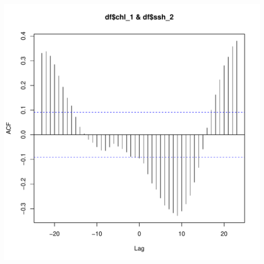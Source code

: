 \documentclass{article}\usepackage[]{graphicx}\usepackage[]{color}
\makeatletter
\def\maxwidth{ %
  \ifdim\Gin@nat@width>\linewidth
    \linewidth
  \else
    \Gin@nat@width
  \fi
}
\newenvironment{knitrout}{}{} %
\makeatother
\begin{document}
\begin{knitrout}
\includegraphics[width=\maxwidth]{figure/unnamed-chunk-12-2} 

\end{knitrout}
\end{document}
